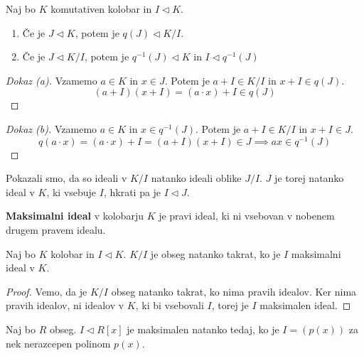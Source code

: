 \documentclass[11pt, a4paper]{article}
\begin{document}
    \begin{proposition}
        Naj bo \(K\) komutativen kolobar in \(I \triangleleft K\).
        \begin{enumerate}[label=\alph*)]
            \item Če je \(J \triangleleft K\), potem je \(q(J) \triangleleft K / I\).
            \item Če je \(J \triangleleft K / I\), potem je \(q^{-1}(J) \triangleleft K\) in \(I \triangleleft q^{-1}(J)\) 
        \end{enumerate}
    \end{proposition}

    \begin{proof}[Dokaz \emph{(a)}]
        Vzamemo \(a \in K\) in \(x \in J\). Potem je \(a+I \in K / I\) in \(x + I \in q(J)\).
        \[(a+I)(x+I) = (a \cdot x) + I \in q(J)\]
    \end{proof}

    \begin{proof}[Dokaz \emph{(b)}]
        Vzamemo \(a \in K\) in \(x \in q^{-1}(J)\). Potem je \(a+I \in K / I\) in \(x + I \in J\).
        \[q(a \cdot x) = (a \cdot x) + I = (a+I)(x+I) \in J \implies ax \in q^{-1}(J)\]
    \end{proof}

    Pokazali smo, da so ideali v \(K / I\) natanko ideali oblike \(J / I\). \(J\) je torej natanko ideal v \(K\), ki vsebuje \(I\), hkrati pa je \(I \triangleleft J\).

    \begin{definition}
        \textbf{Maksimalni ideal} v kolobarju \(K\) je pravi ideal, ki ni vsebovan v nobenem drugem pravem idealu.
    \end{definition}

    \begin{theorem}
        Naj bo \(K\) kolobar in \(I \triangleleft K\). \(K / I\) je obseg natanko takrat, ko je \(I\) maksimalni ideal v \(K\).
    \end{theorem}

    \begin{proof}
        Vemo, da je \(K / I\) obseg natanko takrat, ko nima pravih idealov. Ker nima pravih idealov, ni idealov v \(K\), ki bi vsebovali \(I\), torej je \(I\) maksimalen ideal.
    \end{proof}
    

    \begin{theorem}
        Naj bo \(R\) obseg. \(I \triangleleft R[x]\) je maksimalen natanko tedaj, ko je \(I = (p(x))\) za nek nerazcepen polinom \(p(x)\).
    \end{theorem}
\end{document}
